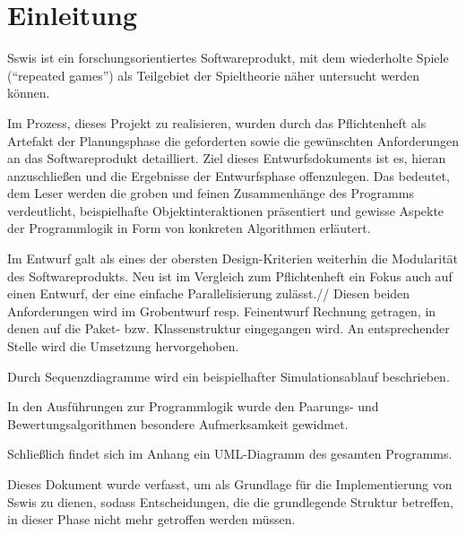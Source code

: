\section{Einleitung}

Sswis ist ein forschungsorientiertes Softwareprodukt, mit dem wiederholte Spiele ("`repeated games"') als Teilgebiet der Spieltheorie näher untersucht werden können.

Im Prozess, dieses Projekt zu realisieren, wurden durch das Pflichtenheft als Artefakt der Planungsphase die geforderten sowie die gewünschten Anforderungen an das Softwareprodukt detailliert. Ziel dieses Entwurfsdokuments ist es, hieran anzuschließen und die Ergebnisse der Entwurfsphase offenzulegen. Das bedeutet, dem Leser werden die groben und feinen Zusammenhänge des Programms verdeutlicht, beispielhafte Objektinteraktionen präsentiert und gewisse Aspekte der Programmlogik in Form von konkreten Algorithmen erläutert.

Im Entwurf galt als eines der obersten Design-Kriterien weiterhin die Modularität des Softwareprodukts. Neu ist im Vergleich zum Pflichtenheft ein Fokus auch auf einen Entwurf, der eine einfache Parallelisierung zulässt.//
Diesen beiden Anforderungen wird im Grobentwurf resp. Feinentwurf Rechnung getragen, in denen auf die Paket- bzw. Klassenstruktur eingegangen wird. An entsprechender Stelle wird die Umsetzung hervorgehoben.

Durch Sequenzdiagramme wird ein beispielhafter Simulationsablauf beschrieben.

In den Ausführungen zur Programmlogik wurde den Paarungs- und Bewertungsalgorithmen besondere Aufmerksamkeit gewidmet.

Schließlich findet sich im Anhang ein UML-Diagramm des gesamten Programms.


Dieses Dokument wurde verfasst, um als Grundlage für die Implementierung von Sswis zu dienen, sodass Entscheidungen, die die grundlegende Struktur betreffen, in dieser Phase nicht mehr getroffen werden müssen.
